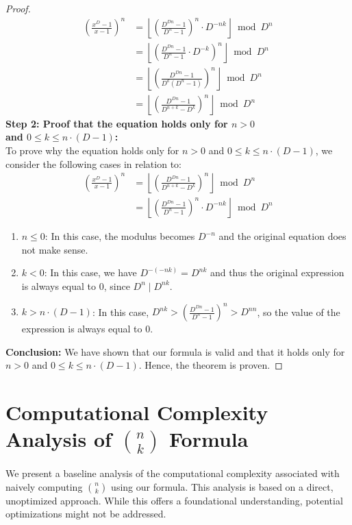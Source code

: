 \documentclass{article}
\theoremstyle{plain}
\theoremstyle{definition}
\begin{document}
\begin{proof}
\begin{align}
    [x^k] \left(\frac{x^{D}-1}{x-1}\right)^n &= \left\lfloor \left(\frac{D^{Dn} - 1}{D^{n} - 1}\right)^n \cdot D^{-n k}\right\rfloor \bmod D^n \\
    &= \left\lfloor \left(\frac{D^{Dn} - 1}{D^{n} - 1} \cdot D^{-k}\right)^n\right\rfloor \bmod D^n \\
    &= \left\lfloor \left(\frac{D^{Dn} - 1}{D^k (D^{n} - 1)}\right)^n\right\rfloor \bmod D^n \\
    &= \left\lfloor \left(\frac{D^{Dn} - 1}{D^{n+k} - D^k}\right)^n\right\rfloor \bmod D^n
\end{align}
\textbf{Step 2: Proof that the equation holds only for $n > 0$\\and $0 \leq k \leq n \cdot (D - 1)$:} \\
To prove why the equation holds only for $n > 0$ and $0 \leq k \leq n \cdot (D-1)$, we consider the following cases in relation to:
\begin{align}
    [x^k] \left(\frac{x^{D}-1}{x-1}\right)^n &= \left\lfloor \left(\frac{D^{Dn} - 1}{D^{n+k} - D^k}\right)^n\right\rfloor \bmod D^n \\
    &= \left\lfloor \left(\frac{D^{Dn} - 1}{D^{n} - 1}\right)^n \cdot D^{-n k}\right\rfloor \bmod D^n
\end{align}
\begin{enumerate}
    \item $n \leq 0$: In this case, the modulus becomes $D^{-n}$ and the original equation does not make sense.
    \item $k < 0$: In this case, we have $D^{-(-nk)} = D^{nk}$ and thus the original expression is always equal to $0$, since $D^{n} \mid D^{nk}$.
    \item $k > n \cdot (D-1)$: In this case, $D^{nk} > \left(\frac{D^{Dn} - 1}{D^{n} - 1}\right)^{n} > D^{nn}$, so the value of the expression is always equal to $0$.
\end{enumerate}
\noindent
\textbf{Conclusion:}
We have shown that our formula is valid and that it holds only for $n > 0$ and $0 \leq k \leq n \cdot (D - 1)$. Hence, the theorem is proven.
\end{proof}

\section[Computational Complexity Analysis of Binomial Coefficient Formula]{Computational Complexity Analysis of \(\binom{n}{k}\) Formula}
We present a baseline analysis of the computational complexity associated with naively computing $\binom{n}{k}$ using our formula. This analysis is based on a direct, unoptimized approach. While this offers a foundational understanding, potential optimizations might not be addressed.
\end{document}
